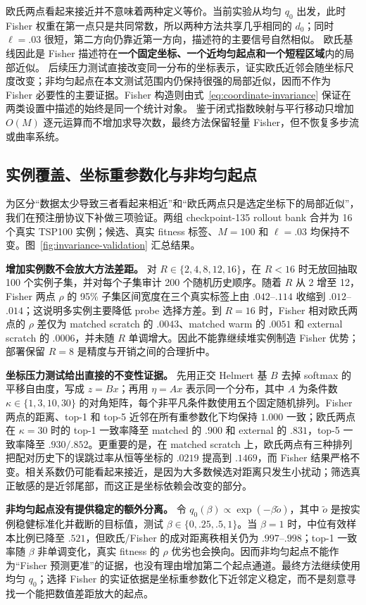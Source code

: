 \documentclass[UTF8,11pt]{ctexart}
\begin{document}
欧氏两点看起来接近并不意味着两种定义等价。当前实验从均匀 $q_0$ 出发，此时 Fisher 权重在第一点只是共同常数，所以两种方法共享几乎相同的 $d_0$；同时 $\ell=.03$ 很短，第二方向仍靠近第一方向，描述符的主要信号自然相似。
欧氏基线因此是 Fisher 描述符在\textbf{一个固定坐标、一个近均匀起点和一个短程区域}内的局部近似。
后续压力测试直接改变同一分布的坐标表示，证实欧氏近邻会随坐标尺度改变；非均匀起点在本文测试范围内仍保持很强的局部近似，因而不作为 Fisher 必要性的主要证据。Fisher 构造则由式~\eqref{eq:coordinate-invariance} 保证在两类设置中描述的始终是同一个统计对象。
鉴于闭式指数映射与平行移动只增加 $O(M)$ 逐元运算而不增加求导次数，最终方法保留轻量 Fisher，但不恢复多步流或曲率系统。

\subsection{实例覆盖、坐标重参数化与非均匀起点}

为区分“数据太少导致三者看起来相近”和“欧氏两点只是选定坐标下的局部近似”，我们在预注册协议下补做三项验证。两组 checkpoint-135 rollout bank 合并为 16 个真实 TSP100 实例；候选、真实 fitness 标签、$M=100$ 和 $\ell=.03$ 均保持不变。图~\ref{fig:invariance-validation} 汇总结果。

\textbf{增加实例数不会放大方法差距。}
对 $R\in\{2,4,8,12,16\}$，在 $R<16$ 时无放回抽取 100 个实例子集，并对每个子集审计 200 个随机历史顺序。随着 $R$ 从 2 增至 12，Fisher 两点 $\rho$ 的 95\% 子集区间宽度在三个真实标签上由 $.042$--$.114$ 收缩到 $.012$--$.014$；这说明多实例主要降低 probe 选择方差。到 $R=16$ 时，Fisher 相对欧氏两点的 $\rho$ 差仅为 matched scratch 的 $.0043$、matched warm 的 $.0051$ 和 external scratch 的 $.0006$，并未随 $R$ 单调增大。因此不能靠继续堆实例制造 Fisher 优势；部署保留 $R=8$ 是精度与开销之间的合理折中。

\textbf{坐标压力测试给出直接的不变性证据。}
先用正交 Helmert 基 $B$ 去掉 softmax 的平移自由度，写成 $z=Bx$；再用 $\eta=Ax$ 表示同一个分布，其中 $A$ 为条件数 $\kappa\in\{1,3,10,30\}$ 的对角矩阵，每个非平凡条件数使用五个固定随机排列。Fisher 两点的距离、top-1 和 top-5 近邻在所有重参数化下均保持 $1.000$ 一致；欧氏两点在 $\kappa=30$ 时的 top-1 一致率降至 matched 的 $.900$ 和 external 的 $.831$，top-5 一致率降至 $.930/.852$。更重要的是，在 matched scratch 上，欧氏两点有三种排列把配对历史下的误跳过率从恒等坐标的 $.0219$ 提高到 $.1469$，而 Fisher 结果严格不变。相关系数仍可能看起来接近，是因为大多数候选对距离只发生小扰动；筛选真正敏感的是近邻尾部，而这正是坐标依赖会改变的部分。

\textbf{非均匀起点没有提供稳定的额外分离。}
令 $q_0(\beta)\propto\exp(-\beta\widetilde o)$，其中 $\widetilde o$ 是按实例稳健标准化并截断的目标值，测试 $\beta\in\{0,.25,.5,1\}$。当 $\beta=1$ 时，中位有效样本比例已降至 $.521$，但欧氏/Fisher 的成对距离秩相关仍为 $.997$--$.998$；top-1 一致率随 $\beta$ 非单调变化，真实 fitness 的 $\rho$ 优劣也会换向。因而非均匀起点不能作为“Fisher 预测更准”的证据，也没有理由增加第二个起点通道。最终方法继续使用均匀 $q_0$；选择 Fisher 的实证依据是坐标重参数化下近邻定义稳定，而不是刻意寻找一个能把数值差距放大的起点。
\end{document}
